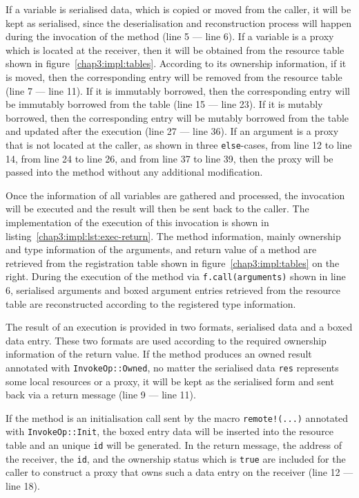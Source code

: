 If a variable is serialised data, which is copied or moved from the caller, it will be kept as serialised, since the deserialisation and reconstruction process will happen during the invocation of the method (line 5 --- line 6).
If a variable is a proxy which is located at the receiver, then it will be obtained from the resource table shown in figure~\ref{chap3:impl:tables}. According to its ownership information, if it is moved, then the corresponding entry will be removed from the resource table (line 7 --- line 11). 
If it is immutably borrowed, then the corresponding entry will be immutably borrowed from the table (line 15 --- line 23). If it is mutably borrowed, then the corresponding entry will be mutably borrowed from the table and updated after the execution (line 27 --- line 36). 
If an argument is a proxy that is not located at the caller, as shown in three \texttt{else}-cases, from line 12 to line 14, from line 24 to line 26, and from line 37 to line 39, then the proxy will be passed into the method without any additional modification.

Once the information of all variables are gathered and processed, the invocation will be executed and the result will then be sent back to the caller. The implementation of the execution of this invocation is shown in listing~\ref{chap3:impl:lst:exec-return}. The method information, mainly ownership and type information of the arguments, and return value of a method are retrieved from the registration table shown in figure~\ref{chap3:impl:tables} on the right. During the execution of the method via \texttt{f.call(arguments)} shown in line 6, serialised arguments and boxed argument entries retrieved from the resource table are reconstructed according to the registered type information.

The result of an execution is provided in two formats, serialised data and a boxed data entry. These two formats are used according to the required ownership information of the return value. 
If the method produces an owned result annotated with \texttt{InvokeOp::Owned}, no matter the serialised data \texttt{res} represents some local resources or a proxy, it will be kept as the serialised form and sent back via a return message (line 9 --- line 11). 

If the method is an initialisation call sent by the macro \texttt{remote!(...)} annotated with \texttt{InvokeOp::Init}, the boxed entry data will be inserted into the resource table and an unique \texttt{id} will be generated. In the return message, the address of the receiver, the \texttt{id}, and the ownership status which is \texttt{true} are included for the caller to construct a proxy that owns such a data entry on the receiver (line 12 --- line 18).

